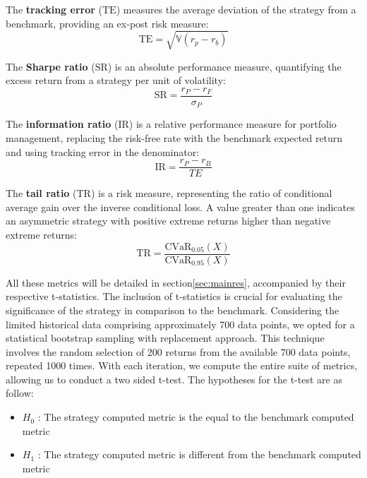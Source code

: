 \documentclass{article}
\begin{document}
The \textbf{tracking error} (\(\text{TE}\)) measures the average deviation of the strategy from a benchmark, providing an ex-post risk measure:
\[\text{TE}=\sqrt{\mathbb{V}(r_p-r_b)}\]

The \textbf{Sharpe ratio} (\(\text{SR}\)) is an absolute performance measure, quantifying the excess return from a strategy per unit of volatility:
\[\text{SR} = \frac{r_P-r_F}{\sigma_P}\]

The \textbf{information ratio} (\(\text{IR}\)) is a relative performance measure for portfolio management, replacing the risk-free rate with the benchmark expected return and using tracking error in the denominator:
\[\text{IR} = \frac{r_P-r_B}{TE}\]

The \textbf{tail ratio} (\(\text{TR}\)) is a risk measure, representing the ratio of conditional average gain over the inverse conditional loss. A value greater than one indicates an asymmetric strategy with positive extreme returns higher than negative extreme returns:
\[\text{TR}=\frac{\text{CVaR}_{0.05}(X)}{\text{CVaR}_{0.95}(X)}\]


All these metrics will be detailed in section\ref{sec:mainres}, accompanied by their respective t-statistics. The inclusion of t-statistics is crucial for evaluating the significance of the strategy in comparison to the benchmark. Considering the limited historical data comprising approximately 700 data points, we opted for a statistical bootstrap sampling with replacement approach. This technique involves the random selection of 200 returns from the available 700 data points, repeated 1000 times. With each iteration, we compute the entire suite of metrics, allowing us to conduct a two sided t-test. The hypotheses for the t-test are as follow:
\begin{itemize}
	\item $H_0$ : The strategy computed metric is the equal to the benchmark computed metric
	\item $H_1$ : The strategy computed metric is different from the benchmark computed metric
\end{itemize}
\end{document}
